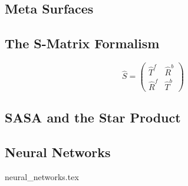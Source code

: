 \subsection{Meta Surfaces}

\subsection{The S-Matrix Formalism}

\begin{equation}
    \hat{S} =
    \begin{pmatrix}
        \hat{T}^f & \hat{R}^b \\
        \hat{R}^f & \hat{T}^b
    \end{pmatrix}
\end{equation}


\subsection{SASA and the Star Product}

\subsection{Neural Networks}
{neural_networks.tex}
